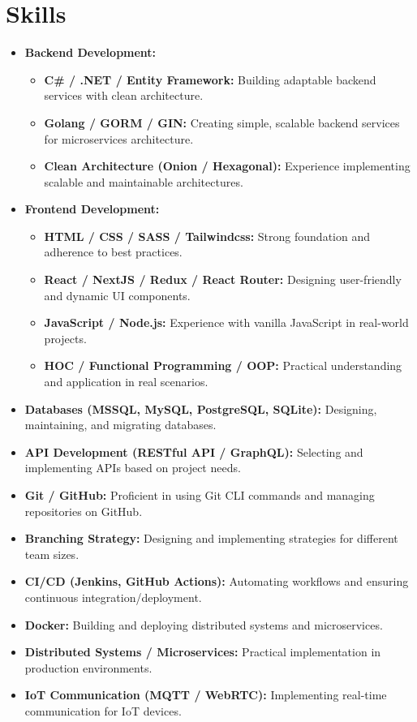 \section{Skills}

\begin{itemize}[leftmargin=1em, label={$\bullet$}]
    \item \textbf{Backend Development:}  
        \begin{itemize}
            \item \textbf{C\# / .NET / Entity Framework:} Building adaptable backend services with clean architecture.
            \item \textbf{Golang / GORM / GIN:} Creating simple, scalable backend services for microservices architecture.
            \item \textbf{Clean Architecture (Onion / Hexagonal):} Experience implementing scalable and maintainable architectures.
        \end{itemize}
    \item \textbf{Frontend Development:}  
        \begin{itemize}
            \item \textbf{HTML / CSS / SASS / Tailwindcss:} Strong foundation and adherence to best practices.
            \item \textbf{React / NextJS / Redux / React Router:} Designing user-friendly and dynamic UI components.
            \item \textbf{JavaScript / Node.js:} Experience with vanilla JavaScript in real-world projects.
            \item \textbf{HOC / Functional Programming / OOP:} Practical understanding and application in real scenarios.
        \end{itemize}
    \item \textbf{Databases (MSSQL, MySQL, PostgreSQL, SQLite):} Designing, maintaining, and migrating databases.
    \item \textbf{API Development (RESTful API / GraphQL):} Selecting and implementing APIs based on project needs.
    \item \textbf{Git / GitHub:} Proficient in using Git CLI commands and managing repositories on GitHub.
    \item \textbf{Branching Strategy:} Designing and implementing strategies for different team sizes.
    \item \textbf{CI/CD (Jenkins, GitHub Actions):} Automating workflows and ensuring continuous integration/deployment.
    \item \textbf{Docker:} Building and deploying distributed systems and microservices.
    \item \textbf{Distributed Systems / Microservices:} Practical implementation in production environments.
    \item \textbf{IoT Communication (MQTT / WebRTC):} Implementing real-time communication for IoT devices.
\end{itemize}
